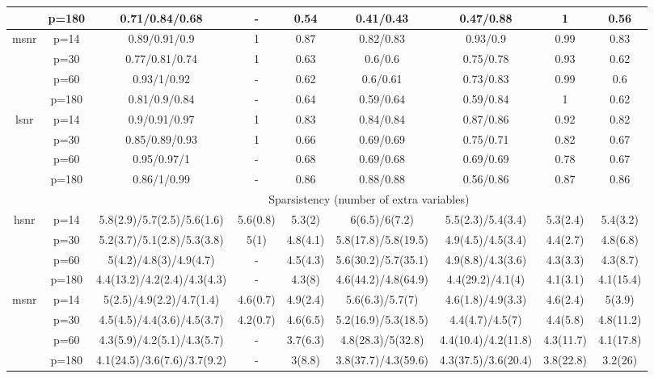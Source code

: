 \begin{table}[ht]
{\begin{tabular}{|c|c|ccccccc|}
   & p=180 & 0.71/0.84/0.68 & - & 0.54 & 0.41/0.43 & 0.47/0.88 & 1 & 0.56 \\ 
  \midrule\multirow{4}[2]{*}{msnr} & p=14 & 0.89/0.91/0.9 & 1 & 0.87 & 0.82/0.83 & 0.93/0.9 & 0.99 & 0.83 \\ 
   & p=30 & 0.77/0.81/0.74 & 1 & 0.63 & 0.6/0.6 & 0.75/0.78 & 0.93 & 0.62 \\ 
   & p=60 & 0.93/1/0.92 & - & 0.62 & 0.6/0.61 & 0.73/0.83 & 0.99 & 0.6 \\ 
   & p=180 & 0.81/0.9/0.84 & - & 0.64 & 0.59/0.64 & 0.59/0.84 & 1 & 0.62 \\ 
  \midrule\multirow{4}[2]{*}{lsnr} & p=14 & 0.9/0.91/0.97 & 1 & 0.83 & 0.84/0.84 & 0.87/0.86 & 0.92 & 0.82 \\ 
   & p=30 & 0.85/0.89/0.93 & 1 & 0.66 & 0.69/0.69 & 0.75/0.71 & 0.82 & 0.67 \\ 
   & p=60 & 0.95/0.97/1 & - & 0.68 & 0.69/0.68 & 0.69/0.69 & 0.78 & 0.67 \\ 
   & p=180 & 0.86/1/0.99 & - & 0.86 & 0.88/0.88 & 0.56/0.86 & 0.87 & 0.86 \\ 
   \midrule 
 \multicolumn{1}{|c}{} &       & \multicolumn{7}{c|}{Sparsistency (number of extra variables)} \\
\midrule\multirow{4}[2]{*}{hsnr} & p=14 & 5.8(2.9)/5.7(2.5)/5.6(1.6) & 5.6(0.8) & 5.3(2) & 6(6.5)/6(7.2) & 5.5(2.3)/5.4(3.4) & 5.3(2.4) & 5.4(3.2) \\ 
   & p=30 & 5.2(3.7)/5.1(2.8)/5.3(3.8) & 5(1) & 4.8(4.1) & 5.8(17.8)/5.8(19.5) & 4.9(4.5)/4.5(3.4) & 4.4(2.7) & 4.8(6.8) \\ 
   & p=60 & 5(4.2)/4.8(3)/4.9(4.7) & - & 4.5(4.3) & 5.6(30.2)/5.7(35.1) & 4.9(8.8)/4.3(3.6) & 4.3(3.3) & 4.3(8.7) \\ 
   & p=180 & 4.4(13.2)/4.2(2.4)/4.3(4.3) & - & 4.3(8) & 4.6(44.2)/4.8(64.9) & 4.4(29.2)/4.1(4) & 4.1(3.1) & 4.1(15.4) \\ 
  \midrule\multirow{4}[2]{*}{msnr} & p=14 & 5(2.5)/4.9(2.2)/4.7(1.4) & 4.6(0.7) & 4.9(2.4) & 5.6(6.3)/5.7(7) & 4.6(1.8)/4.9(3.3) & 4.6(2.4) & 5(3.9) \\ 
   & p=30 & 4.5(4.5)/4.4(3.6)/4.5(3.7) & 4.2(0.7) & 4.6(6.5) & 5.2(16.9)/5.3(18.5) & 4.4(4.7)/4.5(7) & 4.4(5.8) & 4.8(11.2) \\ 
   & p=60 & 4.3(5.9)/4.2(5.1)/4.3(5.7) & - & 3.7(6.3) & 4.8(28.3)/5(32.8) & 4.4(10.4)/4.2(11.8) & 4.3(11.7) & 4.1(17.8) \\ 
   & p=180 & 4.1(24.5)/3.6(7.6)/3.7(9.2) & - & 3(8.8) & 3.8(37.7)/4.3(59.6) & 4.3(37.5)/3.6(20.4) & 3.8(22.8) & 3.2(26) \\ 

\end{tabular}}
\end{table}
